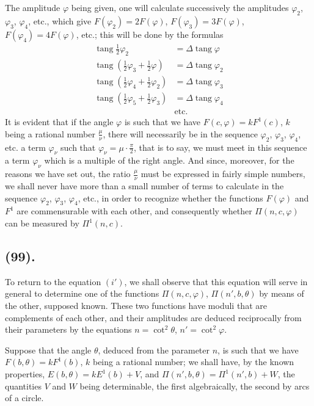 \documentclass{article}
\begin{document}
The amplitude $\varphi$ being given, one will calculate successively the amplitudes $\varphi_{2}$, $\varphi_{3}$, $\varphi_{4}$, etc., which give $F(\varphi_{2})=2F(\varphi)$, $F(\varphi_{3})=3F(\varphi)$, $F(\varphi_{4})=4F(\varphi)$, etc.; this will be done by the formulas
\[ \begin{aligned} \operatorname{tang}\tfrac{1}{2}\varphi_{2}&=\Delta\operatorname{tang}\varphi\\ \operatorname{tang}(\tfrac{1}{2}\varphi_{3}+\tfrac{1}{2}\varphi)&=\Delta\operatorname{tang}\varphi_{2}\\ \operatorname{tang}(\tfrac{1}{2}\varphi_{4}+\tfrac{1}{2}\varphi_{2})&=\Delta\operatorname{tang}\varphi_{3}\\ \operatorname{tang}(\tfrac{1}{2}\varphi_{5}+\tfrac{1}{2}\varphi_{3})&=\Delta\operatorname{tang}\varphi_{4}\\ &\text{etc.} \end{aligned} \]
It is evident that if the angle $\varphi$ is such that we have $F(c,\varphi)=kF^{1}(c)$, $k$ being a rational number $\frac{\mu}{\nu}$, there will necessarily be in the sequence $\varphi_{2}$, $\varphi_{3}$, $\varphi_{4}$, etc. a term $\varphi_{\nu}$ such that $\varphi_{\nu}=\mu\cdot\frac{\pi}{2}$, that is to say, we must meet in this sequence a term $\varphi_{\nu}$ which is a multiple of the right angle. And since, moreover, for the reasons we have set out, the ratio $\frac{\mu}{\nu}$ must be expressed in fairly simple numbers, we shall never have more than a small number of terms to calculate in the sequence $\varphi_{2}$, $\varphi_{3}$, $\varphi_{4}$, etc., in order to recognize whether the functions $F(\varphi)$ and $F^{1}$ are commensurable with each other, and consequently whether $\Pi(n,c,\varphi)$ can be measured by $\Pi^{1}(n,c)$.

\subsection*{(99).}

To return to the equation $(i')$, we shall observe that this equation will serve in general to determine one of the functions $\Pi(n,c,\varphi)$, $\Pi(n',b,\theta)$ by means of the other, supposed known. These two functions have moduli that are complements of each other, and their amplitudes are deduced reciprocally from their parameters by the equations $n=\cot^{2}\theta$, $n'=\cot^{2}\varphi$.

Suppose that the angle $\theta$, deduced from the parameter $n$, is such that we have $F(b,\theta)=kF^{1}(b)$, $k$ being a rational number; we shall have, by the known properties, $E(b,\theta)=kE^{1}(b)+V$, and $\Pi(n',b,\theta)=\Pi^{1}(n',b)+W$, the quantities $V$ and $W$ being determinable, the first algebraically, the second by arcs of a circle.
\end{document}
